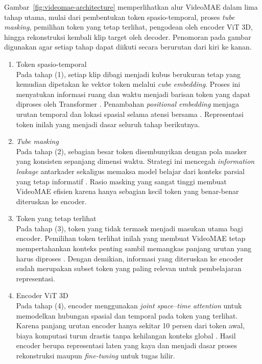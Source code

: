 Gambar~\ref{fig:videomae-architecture} memperlihatkan alur VideoMAE dalam lima tahap utama, mulai dari pembentukan token spasio-temporal, proses \textit{tube masking}, pemilihan token yang tetap terlihat, pengodean oleh encoder ViT 3D, hingga rekonstruksi kembali klip target oleh decoder. Penomoran pada gambar digunakan agar setiap tahap dapat diikuti secara berurutan dari kiri ke kanan.\par
\begin{enumerate}
\item Token spasio-temporal\\
Pada tahap (1), setiap klip dibagi menjadi kubus berukuran tetap yang kemudian dipetakan ke vektor token melalui \textit{cube embedding}. Proses ini menyatukan informasi ruang dan waktu menjadi barisan token yang dapat diproses oleh Transformer \cite{Tong2022VideoMAE}. Penambahan \textit{positional embedding} menjaga urutan temporal dan lokasi spasial selama atensi bersama \cite{Tong2022VideoMAE}. Representasi token inilah yang menjadi dasar seluruh tahap berikutnya.

\item \textit{Tube masking}\\
Pada tahap (2), sebagian besar token disembunyikan dengan pola masker yang konsisten sepanjang dimensi waktu. Strategi ini mencegah \textit{information leakage} antarkader sekaligus memaksa model belajar dari konteks parsial yang tetap informatif \cite{Tong2022VideoMAE}. Rasio masking yang sangat tinggi membuat VideoMAE efisien karena hanya sebagian kecil token yang benar-benar diteruskan ke encoder.

\item Token yang tetap terlihat\\
Pada tahap (3), token yang tidak termask menjadi masukan utama bagi encoder. Pemilihan token terlihat inilah yang membuat VideoMAE tetap mempertahankan konteks penting sambil memangkas panjang urutan yang harus diproses \cite{Tong2022VideoMAE}. Dengan demikian, informasi yang diteruskan ke encoder sudah merupakan subset token yang paling relevan untuk pembelajaran representasi.

\item Encoder ViT 3D\\
Pada tahap (4), encoder menggunakan \textit{joint space--time attention} untuk memodelkan hubungan spasial dan temporal pada token yang terlihat. Karena panjang urutan encoder hanya sekitar 10 persen dari token awal, biaya komputasi turun drastis tanpa kehilangan konteks global \cite{Tong2022VideoMAE}. Hasil encoder berupa representasi laten yang kaya dan menjadi dasar proses rekonstruksi maupun \textit{fine-tuning} untuk tugas hilir.


\end{enumerate}
